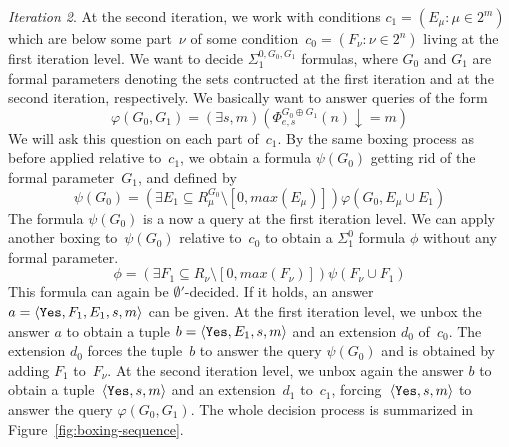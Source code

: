 \emph{Iteration 2}. At the second iteration, we work with conditions $c_1 = (E_\mu : \mu \in 2^m)$
which are below some part~$\nu$ of some condition~$c_0 = (F_\nu : \nu \in 2^n)$ living at the first iteration level.
We want to decide $\Sigma^{0,G_0, G_1}_1$ formulas, where $G_0$ and $G_1$
are formal parameters denoting the sets contructed at the first iteration and at the second iteration, respectively.
We basically want to answer queries of the form
$$
\varphi(G_0, G_1) = (\exists s, m)(\Phi^{G_0 \oplus G_1}_{e,s}(n) \downarrow = m)
$$
We will ask this question on each part of~$c_1$.
By the same boxing process as before applied relative to~$c_1$, we obtain a formula $\psi(G_0)$ getting
rid of the formal parameter~$G_1$, and defined by
\[
\psi(G_0) = (\exists E_1 \subseteq R^{G_0}_\mu \setminus [0, max(E_\mu)])\varphi(G_0, E_\mu \cup E_1)
\]
The formula $\psi(G_0)$ is a now a query at the first iteration level. We can apply
another boxing to~$\psi(G_0)$ relative to~$c_0$ to obtain a $\Sigma^0_1$
formula $\phi$ without any formal parameter.
\[
\phi = (\exists F_1 \subseteq R_\nu \setminus [0, max(F_\nu)])\psi(F_\nu \cup F_1)
\]
This formula can again be $\emptyset'$-decided. If it holds,
an answer $a = \left\langle \mathtt{Yes}, F_1, E_1, s, m \right\rangle$ can be given. At the first iteration level,
we unbox the answer $a$ to obtain a tuple $b = \left\langle \mathtt{Yes}, E_1, s, m \right\rangle$ and an extension $d_0$ of~$c_0$.
The extension $d_0$ forces the tuple~$b$ to answer the query $\psi(G_0)$
and is obtained by adding $F_1$ to~$F_\nu$.
At the second iteration level, we unbox again the answer $b$ to obtain a tuple~$\left\langle \mathtt{Yes}, s,m \right\rangle$
and an extension~$d_1$ to~$c_1$, forcing~$\left\langle \mathtt{Yes}, s,m \right\rangle$ to answer the query $\varphi(G_0, G_1)$.
The whole decision process is summarized in Figure~\ref{fig:boxing-sequence}.


